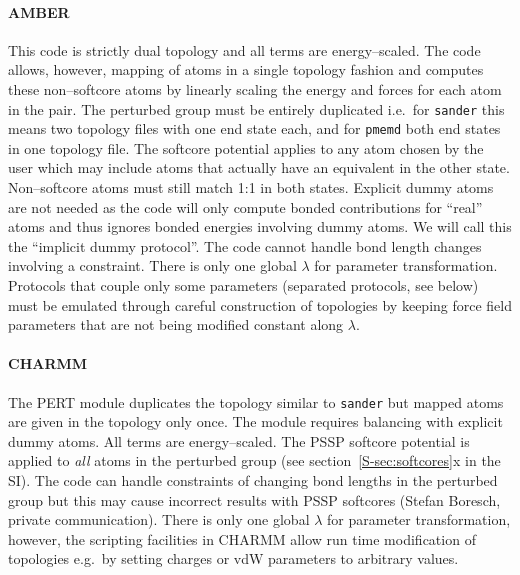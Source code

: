 \documentclass[journal=jctcce,manuscript=article]{achemso}
\newcommand{\progname}[1]{\texttt{#1}}
\begin{document}
\paragraph{AMBER} %
This code is strictly dual topology and all terms
are energy--scaled.
The code allows, however, mapping of atoms in a
single topology fashion and computes these non--softcore atoms 
by linearly scaling the energy and forces for each atom in the pair.
The perturbed group must be entirely duplicated i.e.\ for \progname{sander} 
this means two topology files with one end state each, and for \progname{pmemd} 
both end states in one topology file.  The softcore potential applies to any 
atom chosen by the user which may include atoms that actually have an 
equivalent in the other state.  Non--softcore atoms must still match 1:1 in 
both states.  Explicit dummy atoms are not needed as the code will only compute 
bonded contributions for ``real'' atoms and thus ignores bonded energies 
involving dummy atoms.  We will call this the ``implicit dummy protocol''. The 
code cannot handle bond length changes involving a constraint.  There is only 
one global $\lambda$ for parameter transformation.  Protocols that couple only 
some parameters (separated protocols, see below) must be emulated through 
careful construction of topologies by keeping force field parameters that are 
not being modified constant along $\lambda$.

\paragraph{CHARMM} The PERT module duplicates the topology similar to
\progname{sander} but mapped atoms are given in the topology only once.
The module requires balancing with explicit dummy atoms.  All terms are
energy--scaled.  The PSSP softcore potential is applied to \emph{all}
atoms in the perturbed group (see section~\ref{S-sec:softcores}x in the SI).  
The 
code can handle constraints of changing bond lengths in the perturbed group but this
may cause incorrect results with PSSP softcores (Stefan Boresch, private
communication).  There is only one global $\lambda$ for parameter
transformation, however, the scripting facilities in CHARMM allow run time
modification of topologies e.g.\ by setting charges or vdW parameters
to arbitrary values.
\end{document}
